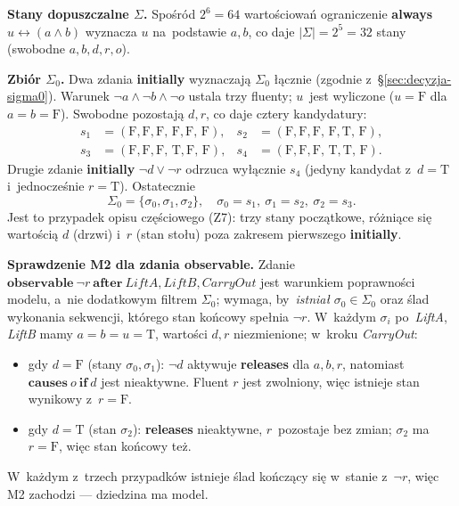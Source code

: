 \documentclass[11pt,a4paper]{article}
\newcommand{\causes}{\textbf{causes}}
\newcommand{\aft}{\textbf{after}}
\renewcommand{\iff}{\textbf{if}}
\newcommand{\initially}{\textbf{initially}}
\newcommand{\always}{\textbf{always}}
\newcommand{\releases}{\textbf{releases}}
\newcommand{\observable}{\textbf{observable}}
\theoremstyle{definition}
\begin{document}
\medskip
\noindent\textbf{Stany dopuszczalne $\Sigma$.}
Spośród $2^6 = 64$ wartościowań ograniczenie \always{} $u \leftrightarrow (a \land b)$
wyznacza $u$ na~podstawie $a, b$, co daje $|\Sigma| = 2^5 = 32$ stany
(swobodne $a, b, d, r, o$).

\medskip
\noindent\textbf{Zbiór $\Sigma_0$.}
Dwa zdania \initially{} wyznaczają $\Sigma_0$ łącznie (zgodnie z~§\ref{sec:decyzja-sigma0}).
Warunek $\neg a \land \neg b \land \neg o$ ustala trzy fluenty;
$u$~jest wyliczone ($u = \text{F}$ dla $a = b = \text{F}$).
Swobodne pozostają $d, r$, co daje cztery kandydatury:
\begin{align*}
  s_1 &= (\text{F},\text{F},\text{F},\,\text{F},\text{F},\,\text{F}), &
  s_2 &= (\text{F},\text{F},\text{F},\,\text{F},\text{T},\,\text{F}), \\
  s_3 &= (\text{F},\text{F},\text{F},\,\text{T},\text{F},\,\text{F}), &
  s_4 &= (\text{F},\text{F},\text{F},\,\text{T},\text{T},\,\text{F}).
\end{align*}
Drugie zdanie \initially{} $\neg d \lor \neg r$ odrzuca wyłącznie $s_4$
(jedyny kandydat z~$d = \text{T}$ i~jednocześnie $r = \text{T}$). Ostatecznie
\[
  \Sigma_0 = \{\sigma_0, \sigma_1, \sigma_2\}, \quad
  \sigma_0 = s_1,\ \sigma_1 = s_2,\ \sigma_2 = s_3.
\]
Jest to przypadek opisu częściowego (Z7): trzy stany początkowe, różniące
się wartością $d$ (drzwi) i~$r$ (stan stołu) poza zakresem pierwszego \initially{}.

\medskip
\noindent\textbf{Sprawdzenie M2 dla zdania \observable{}.}
Zdanie $\observable\ \neg r\ \aft\ \mathit{LiftA}, \mathit{LiftB}, \mathit{CarryOut}$
jest warunkiem poprawności modelu, a~nie dodatkowym filtrem $\Sigma_0$;
wymaga, by~\emph{istniał} $\sigma_0 \in \Sigma_0$ oraz ślad wykonania sekwencji,
którego stan końcowy spełnia $\neg r$. W~każdym $\sigma_i$ po~\textit{LiftA}, \textit{LiftB}
mamy $a = b = u = \text{T}$, wartości $d, r$ niezmienione; w~kroku \textit{CarryOut}:
\begin{itemize}[topsep=2pt]
  \item gdy $d = \text{F}$ (stany $\sigma_0, \sigma_1$): $\neg d$ aktywuje \releases{}
        dla $a, b, r$, natomiast $\causes\ o\ \iff\ d$ jest nieaktywne.
        Fluent $r$ jest zwolniony, więc istnieje stan wynikowy z~$r = \text{F}$.
  \item gdy $d = \text{T}$ (stan $\sigma_2$): \releases{} nieaktywne, $r$~pozostaje
        bez zmian; $\sigma_2$ ma $r = \text{F}$, więc stan końcowy też.
\end{itemize}
W~każdym z~trzech przypadków istnieje ślad kończący się w~stanie z~$\neg r$,
więc M2 zachodzi --- dziedzina ma model.
\end{document}
